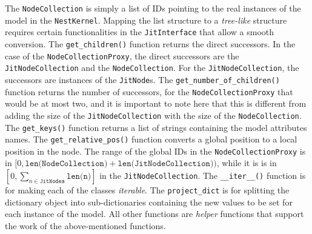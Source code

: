 The \texttt{NodeCollection} is simply a list of IDs pointing to the real instances of the model in the \texttt{NestKernel}. Mapping the list structure to a \emph{tree-like} structure requires certain functionalities in the \texttt{JitInterface} that allow a smooth conversion. The \texttt{get\_children()} function returns the direct successors. In the case of the \texttt{NodeCollectionProxy}, the direct successors are the \texttt{JitNodeCollection} and the \texttt{NodeCollection}. For the \texttt{JitNodeCollection}, the successors are instances of the \texttt{JitNode}s. The \texttt{get\_number\_of\_children()} function returns the number of successors, for the \texttt{NodeCollectionProxy} that would be at most two, and it is important to note here that this is different from adding the size of the \texttt{JitNodeCollection} with the size of the \texttt{NodeCollection}. The \texttt{get\_keys()} function returns a list of strings containing the model attributes names. The \texttt{get\_relative\_pos()} function converts a global position to a local position in the node. The range of the global IDs in the \texttt{NodeCollectionProxy} is in $[0, \texttt{len(NodeCollection)} + \texttt{len(JitNodeCollection)})$, while it is is in $[0,\sum_{n \in \texttt{JitNodes}} \texttt{len(n)}]$ in the \texttt{JitNodeCollection}. The \texttt{\_\_iter\_\_()} function is for making each of the classes \emph{iterable}. The \texttt{project\_dict} is for splitting the dictionary object into sub-dictionaries containing the new values to be set for each instance of the model. All other functions are \emph{helper} functions that support the work of the above-mentioned functions.

